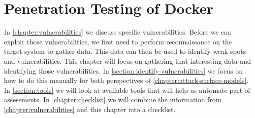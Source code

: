 \chapter{Penetration Testing of Docker}\label{chapter:pentesting}
In \autoref{chapter:vulnerabilities} we discuss specific vulnerabilities. Before we can exploit those vulnerabilities, we first need to perform reconnaissance on the target system to gather data. This data can then be used to identify weak spots and vulnerabilities. This chapter will focus on gathering that interesting data and identifying those vulnerabilities. In \autoref{section:identify-vulnerabilities} we focus on how to do this manually for both perspectives of \autoref{chapter:attack-surface-models}. In \autoref{section:tools} we will look at available tools that will help us automate part of assessments. In \autoref{chapter:checklist} we will combine the information from \autoref{chapter:vulnerabilities} and this chapter into a checklist.



